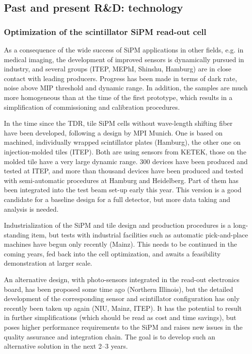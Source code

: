 \subsection{Past and present R\&D: technology}

\subsubsection{Optimization of the scintillator SiPM read-out cell}
\label{sec:OptimizationSiPMRO}

As a consequence of the wide success of SiPM applications in other fields, e.g. in medical imaging, the development of improved sensors is dynamically pursued in industry, and several groups (ITEP, MEPhI, Shinshu, Hamburg) are in close contact with leading producers. Progress has been made in terms of dark rate, noise above MIP threshold and dynamic range. In addition, the samples are much more homogeneous than at the time of the first prototype, which results in a simplification of commissioning and calibration procedures.

In the time since the TDR, tile SiPM cells without wave-length shifting fiber have been developed, following a design by MPI Munich. One is based on machined, individually wrapped scintillator plates (Hamburg), the other one on injection-molded tiles (ITEP). Both are using sensors from KETEK, those on the molded tile have a very large dynamic range. 300 devices have been produced and tested at ITEP, and more than thousand devices have been produced and tested with semi-automatic procedures at Hamburg and Heidelberg. Part of them has been integrated into the test beam set-up early this year. This version is a good candidate for a baseline design for a full detector, but more data taking and analysis is needed.

Industrialization of the SiPM and tile design and production procedures is a long-standing item, but tests with industrial facilities such as automatic pick-and-place machines have begun only recently (Mainz). This needs to be continued in the coming years, fed back into the cell optimization, and awaits a feasibility demonstration at larger scale.

An alternative design, with photo-sensors integrated in the read-out electronics board, has been proposed some time ago (Northern Illinois), but the detailed development of the corresponding sensor and scintillator configuration has only recently been taken up again (NIU, Mainz, ITEP). It has the potential to result in further simplifications (which should be read as cost and time savings), but poses higher performance requirements to the SiPM and raises new issues in the quality assurance and integration chain. The goal is to develop such an alternative solution in the next 2--3 years.

